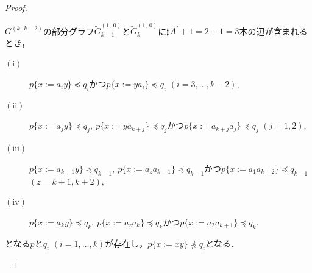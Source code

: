 \begin{proof}
\begin{ex}\label{少なくなるとき}
${G}^{(k,~k-2)}$の部分グラフ$\tilde{G}^{(1,~0)}_{k-1}$と$\tilde{G}^{(1,~0)}_{k}$に$\sharp A^{\prime}+1=2+1=3$本の辺が含まれるとき，
\begin{description}
\item[$(\mathrm{i})$] $p \{ x:= a_{i}y \} \preceq q_{i}$かつ$p \{ x:= ya_{i} \} \preceq q_{i}$ $(i=3, \ldots , k-2)$,
\item[$(\mathrm{ii})$] $p \{ x:=a_{j}y \} \preceq q_{j},~p \{ x:=ya_{k+j} \} \preceq q_{j}$かつ$p \{ x:=a_{k+j}a_{j} \} \preceq q_{j}$ $(j=1,2)$,
\item[$(\mathrm{iii})$] $p \{ x:=a_{k-1}y \} \preceq q_{k-1},~p \{ x:=a_{z}a_{k-1} \} \preceq q_{k-1}$かつ$p \{ x:=a_{1}a_{k+2} \} \preceq q_{k-1}$ \\$(z=k+1,k+2)$,
\item[$(\mathrm{iv})$] $p \{ x:=a_{k}y \} \preceq q_{k},~p \{ x:=a_{z}a_{k} \} \preceq q_{k}$かつ$p \{ x:=a_{2}a_{k+1} \} \preceq q_{k}$.
\end{description}
となる$p$と$q_{i}$ $(i=1,\ldots,k)$が存在し，$p \{ x:=xy \} \not \preceq q_{i}$となる．
\end{ex}


\end{proof}
